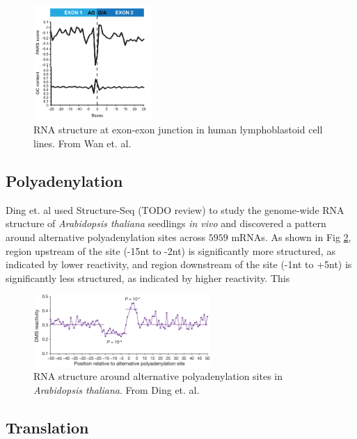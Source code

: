 \documentclass{proposal}
\begin{document}
\begin{figure}[h!]
    \centering
    \includegraphics[width=0.4\textwidth]{exon_exon_junction.png}
    \caption{RNA structure at exon-exon junction in human lymphoblastoid cell lines. From Wan et. al\cite{wan2014landscape}.}
    \label{fig:exon_exon_junction}
    \centering
\end{figure}


\subsection*{Polyadenylation}

Ding et. al\cite{ding2014vivo} used Structure-Seq (TODO review) to study the genome-wide RNA structure of
﻿\textit{Arabidopsis thaliana} seedlings \textit{in vivo} and discovered a pattern around alternative polyadenylation sites across $5959$ mRNAs.
As shown in Fig \ref{fig:poly_a}, region upstream of the site (-15nt to -2nt) is significantly more structured, as indicated by lower reactivity,
and region downstream of the site (-1nt to +5nt) is significantly less structured, as indicated by higher reactivity.
This

\begin{figure}[h!]
    \centering
    \includegraphics[width=0.6\textwidth]{poly_a.png}
    \caption{RNA structure around alternative polyadenylation sites in ﻿\textit{Arabidopsis thaliana}. From Ding et. al\cite{ding2014vivo}.}
    \label{fig:poly_a}
    \centering
\end{figure}





\subsection*{Translation}
\end{document}
